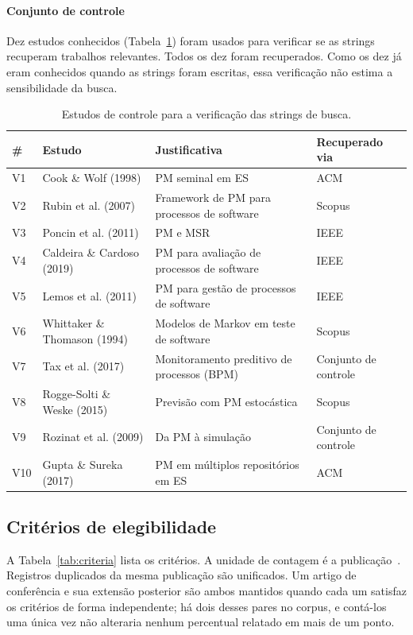 \documentclass[preprint,12pt,authoryear=false]{elsarticle}
\begin{document}
\paragraph{Conjunto de controle}
Dez estudos conhecidos (Tabela~\ref{tab:control}) foram usados para verificar se as strings recuperam trabalhos relevantes. Todos os dez foram recuperados. Como os dez já eram conhecidos quando as strings foram escritas, essa verificação não estima a sensibilidade da busca.

\begin{table}[t]
\centering\small
\caption{Estudos de controle para a verificação das strings de busca.}\label{tab:control}
\footnotesize
\begin{tabularx}{\textwidth}{llXl}
\toprule
\# & Estudo & Justificativa & Recuperado via \\
\midrule
V1 & Cook \& Wolf (1998) & PM seminal em ES & ACM \\
V2 & Rubin et al. (2007) & Framework de PM para processos de software & Scopus \\
V3 & Poncin et al. (2011) & PM e MSR & IEEE \\
V4 & Caldeira \& Cardoso (2019) & PM para avaliação de processos de software & IEEE \\
V5 & Lemos et al. (2011) & PM para gestão de processos de software & IEEE \\
V6 & Whittaker \& Thomason (1994) & Modelos de Markov em teste de software & Scopus \\
V7 & Tax et al. (2017) & Monitoramento preditivo de processos (BPM) & Conjunto de controle \\
V8 & Rogge-Solti \& Weske (2015) & Previsão com PM estocástica & Scopus \\
V9 & Rozinat et al. (2009) & Da PM à simulação & Conjunto de controle \\
V10 & Gupta \& Sureka (2017) & PM em múltiplos repositórios em ES & ACM \\
\bottomrule
\end{tabularx}
\end{table}

\subsection{Critérios de elegibilidade}\label{sec:criteria}

A Tabela~\ref{tab:criteria} lista os critérios. A unidade de contagem é a publicação~\cite{petersen2015}. Registros duplicados da mesma publicação são unificados. Um artigo de conferência e sua extensão posterior são ambos mantidos quando cada um satisfaz os critérios de forma independente; há dois desses pares no corpus, e contá-los uma única vez não alteraria nenhum percentual relatado em mais de um ponto.
\end{document}
